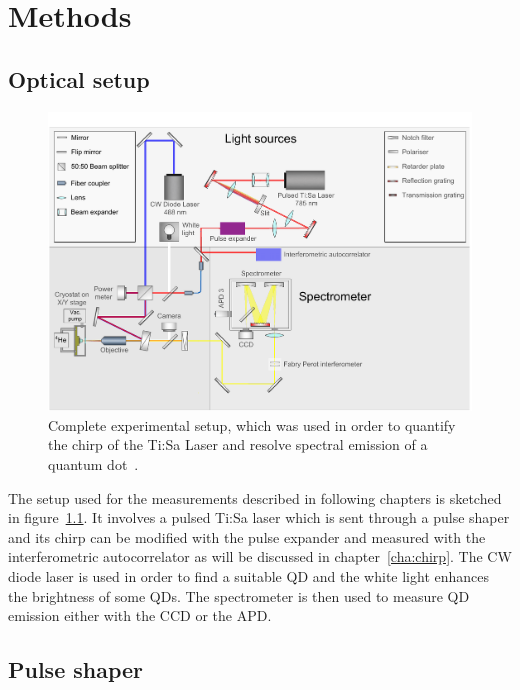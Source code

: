 \chapter{Methods}


\section{Optical setup}

\begin{figure}[H]
	\centering
	\includegraphics[width=1\linewidth]{figures/setup/Setup_flat}
	\caption[Complete experimental setup]{Complete experimental setup, which was used in order to quantify the chirp of the Ti:Sa Laser and resolve spectral emission of a quantum dot~\cite{schimpf_towards_2017}.}
	\label{fig:setupflat}
\end{figure}


The setup used for the measurements described in following chapters is sketched in figure~\ref{fig:setupflat}.
It involves a pulsed Ti:Sa laser which is sent through a pulse shaper and its chirp can be modified with the pulse expander and measured with the interferometric autocorrelator as will be discussed in chapter~\ref{cha:chirp}.
The CW diode laser is used in order to find a suitable \ac{QD} and the white light enhances the brightness of some \acp{QD}.
The spectrometer is then used to measure \ac{QD} emission either with the CCD or the APD.  

\section{Pulse shaper}

